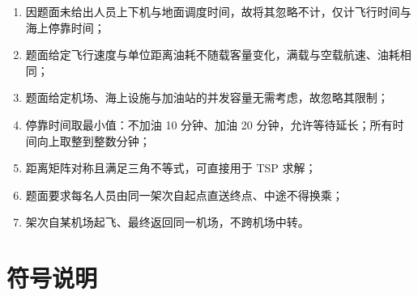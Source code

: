 \documentclass[zihao=-4,a4paper]{ctexart}
\begin{document}
\begin{enumerate}[itemsep=2pt]
  \item 因题面未给出人员上下机与地面调度时间，故将其忽略不计，仅计飞行时间与海上停靠时间；
  \item 题面给定飞行速度与单位距离油耗不随载客量变化，满载与空载航速、油耗相同；
  \item 题面给定机场、海上设施与加油站的并发容量无需考虑，故忽略其限制；
  \item 停靠时间取最小值：不加油 10 分钟、加油 20 分钟，允许等待延长；所有时间向上取整到整数分钟；
  \item 距离矩阵对称且满足三角不等式，可直接用于 TSP 求解；
  \item 题面要求每名人员由同一架次自起点直送终点、中途不得换乘；
  \item 架次自某机场起飞、最终返回同一机场，不跨机场中转。
\end{enumerate}

\section{符号说明}
\end{document}
